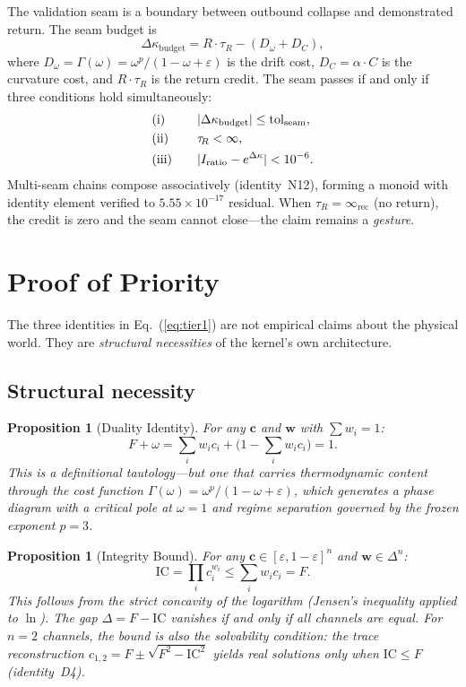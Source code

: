 \documentclass[
  aps,
  prd,
  twocolumn,
  superscriptaddress,
  nofootinbib,
  floatfix
]{revtex4-2}
\newtheorem{proposition}[theorem]{Proposition}
\newcommand{\tR}{\tau_{\!R}}
\newcommand{\Gam}{\Gamma}
\newcommand{\eps}{\varepsilon}
\newcommand{\IR}{\infty_{\mathrm{rec}}}
\newcommand{\tolseam}{\mathrm{tol}_{\mathrm{seam}}}
\newcommand{\beq}{\begin{equation}}
\newcommand{\eeq}{\end{equation}}
\newcommand{\tvec}{\mathbf{c}}
\newcommand{\wvec}{\mathbf{w}}
\newcommand{\IC}{\mathrm{IC}}
\begin{document}
The validation seam is a boundary between outbound collapse and
demonstrated return.  The seam budget is
\beq\label{eq:seam}
  \Delta\kappa_{\mathrm{budget}} = R\cdot\tR - (D_\omega + D_C),
\eeq
where $D_\omega = \Gam(\omega) = \omega^p/(1 - \omega + \eps)$ is
the drift cost, $D_C = \alpha \cdot C$ is the curvature cost, and
$R\cdot\tR$ is the return credit.  The seam passes if and only if
three conditions hold simultaneously:
\begin{alignat}{2}
  &\text{(i)}  &\quad& |\Delta\kappa_{\mathrm{budget}}| \leq \tolseam, \notag\\
  &\text{(ii)} && \tR < \infty, \label{eq:seam-pass}\\
  &\text{(iii)}&& |I_{\mathrm{ratio}} - e^{\Delta\kappa}| < 10^{-6}. \notag
\end{alignat}
Multi-seam chains compose associatively (identity~N12), forming a
monoid with identity element verified to $5.55 \times 10^{-17}$
residual.  When $\tR = \IR$ (no return), the credit is zero and the
seam cannot close---the claim remains a \emph{gesture}.

\section{Proof of Priority}\label{sec:priority}

The three identities in Eq.~(\ref{eq:tier1}) are not empirical claims
about the physical world.  They are \emph{structural necessities} of
the kernel's own architecture.

\subsection{Structural necessity}

\begin{proposition}[Duality Identity]\label{prop:duality}
For any $\tvec$ and $\wvec$ with $\sum w_i = 1$:
\beq\label{eq:duality-proof}
  F + \omega = \textstyle\sum_i w_i c_i + \bigl(1 - \sum_i w_i c_i\bigr) = 1.
\eeq
This is a definitional tautology---but one that carries thermodynamic
content through the cost function
$\Gam(\omega) = \omega^p/(1 - \omega + \eps)$, which generates a
phase diagram with a critical pole at $\omega = 1$ and regime
separation governed by the frozen exponent $p = 3$.
\end{proposition}

\begin{proposition}[Integrity Bound]\label{prop:icbound}
For any $\tvec \in [\eps, 1{-}\eps]^n$ and $\wvec \in \Delta^n$:
\beq\label{eq:ic-bound-proof}
  \IC = \textstyle\prod_i c_i^{w_i} \leq \sum_i w_i c_i = F.
\eeq
This follows from the strict concavity of the logarithm (Jensen's
inequality applied to $\ln$).  The gap $\Delta = F - \IC$ vanishes
if and only if all channels are equal.  For $n = 2$ channels, the
bound is also the \emph{solvability condition}: the trace
reconstruction $c_{1,2} = F \pm \sqrt{F^2 - \IC^2}$ yields real
solutions only when $\IC \leq F$ (identity~D4).
\end{proposition}
\end{document}
